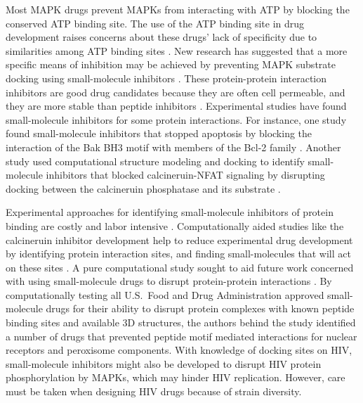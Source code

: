 Most MAPK drugs prevent MAPKs from interacting with ATP by blocking
the conserved ATP binding site. The use of the ATP binding site in
drug development raises concerns about these drugs' lack of
specificity due to similarities among ATP binding sites
\cite{pan09}. New research has suggested that a more specific means of
inhibition may be achieved by preventing MAPK substrate docking using
small-molecule inhibitors \cite{burkhard09,hancock06}. These
protein-protein interaction inhibitors are good drug candidates
because they are often cell permeable, and they are more stable than
peptide inhibitors \cite{thompson1996synthesis}. Experimental studies
have found small-molecule inhibitors for some protein
interactions. For instance, one study found small-molecule inhibitors
that stopped apoptosis by blocking the interaction of the Bak BH3
motif with members of the Bcl-2 family
\cite{degterev2001identification}. Another study used computational
structure modeling and docking to identify small-molecule inhibitors
that blocked calcineruin-NFAT signaling by disrupting docking between
the calcineruin phosphatase and its substrate
\cite{remenyi06,roehrl2004selective}.

Experimental approaches for identifying small-molecule inhibitors of
protein binding are costly and labor intensive
\cite{degterev2001identification,arkin2004small}. Computationally
aided studies like the calcineruin inhibitor development help to
reduce experimental drug development by identifying protein
interaction sites, and finding small-molecules that will act on these
sites \cite{remenyi06}. A pure computational study sought to aid
future work concerned with using small-molecule drugs to disrupt
protein-protein interactions \cite{parthasarathi2008approved}. By
computationally testing all U.S.\ Food and Drug Administration
approved small-molecule drugs for their ability to disrupt protein
complexes with known peptide binding sites and available 3D
structures, the authors behind the study identified a number of drugs
that prevented peptide motif mediated interactions for nuclear
receptors and peroxisome components. With knowledge of docking sites
on HIV, small-molecule inhibitors might also be developed to disrupt
HIV protein phosphorylation by MAPKs, which may hinder HIV
replication. However, care must be taken when designing HIV drugs
because of strain diversity.


